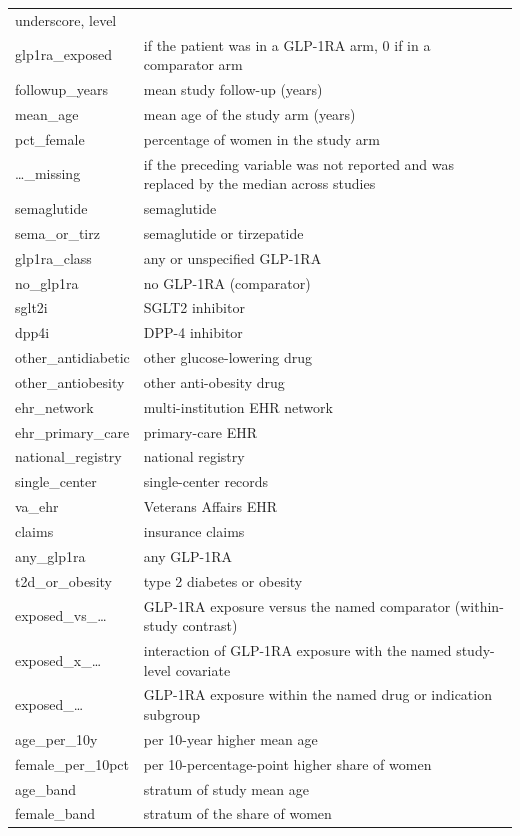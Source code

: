 \documentclass[
  11pt,
]{article}
\begin{document}
\begin{longtable}[]{@{}
  >{\raggedright\arraybackslash}p{}
  >{\raggedright\arraybackslash}p{}@{}}
underscore, level \\
glp1ra\_exposed & 1 if the patient was in a GLP-1RA arm, 0 if in a
comparator arm \\
followup\_years & mean study follow-up (years) \\
mean\_age & mean age of the study arm (years) \\
pct\_female & percentage of women in the study arm \\
\ldots\_missing & 1 if the preceding variable was not reported and was
replaced by the median across studies \\
semaglutide & semaglutide \\
sema\_or\_tirz & semaglutide or tirzepatide \\
glp1ra\_class & any or unspecified GLP-1RA \\
no\_glp1ra & no GLP-1RA (comparator) \\
sglt2i & SGLT2 inhibitor \\
dpp4i & DPP-4 inhibitor \\
other\_antidiabetic & other glucose-lowering drug \\
other\_antiobesity & other anti-obesity drug \\
ehr\_network & multi-institution EHR network \\
ehr\_primary\_care & primary-care EHR \\
national\_registry & national registry \\
single\_center & single-center records \\
va\_ehr & Veterans Affairs EHR \\
claims & insurance claims \\
any\_glp1ra & any GLP-1RA \\
t2d\_or\_obesity & type 2 diabetes or obesity \\
exposed\_vs\_\ldots{} & GLP-1RA exposure versus the named comparator
(within-study contrast) \\
exposed\_x\_\ldots{} & interaction of GLP-1RA exposure with the named
study-level covariate \\
exposed\_\ldots{} & GLP-1RA exposure within the named drug or indication
subgroup \\
age\_per\_10y & per 10-year higher mean age \\
female\_per\_10pct & per 10-percentage-point higher share of women \\
age\_band & stratum of study mean age \\
female\_band & stratum of the share of women \\

\end{longtable}
\end{document}
